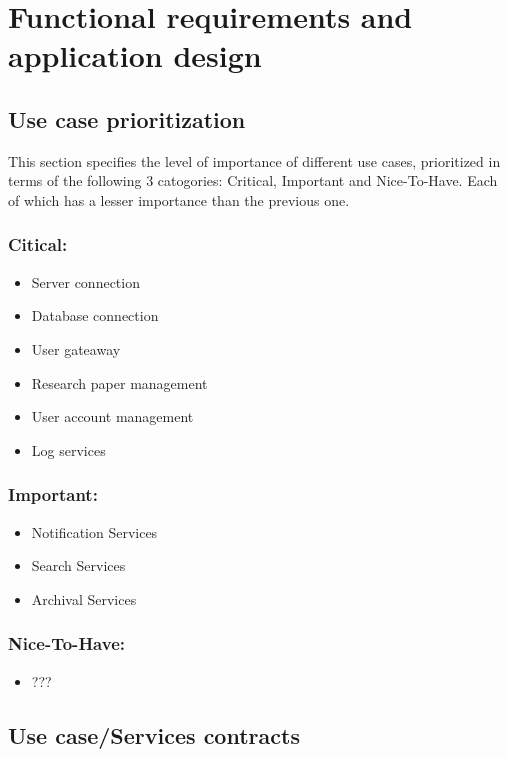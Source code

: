\documentclass[11pt]{article}
\begin{document}
\newpage

\section{Functional requirements and application design}

\subsection{Use case prioritization}
This section specifies the level of importance of different use cases, prioritized in terms of the following 3 catogories: Critical, Important and Nice-To-Have. Each of which has a lesser importance than the previous one.

\subsubsection{Citical:}
	\begin{itemize}
		\item Server connection
		\item Database connection
		\item User gateaway
		\item Research paper management
		\item User account management
		\item Log services
	\end{itemize}
	
\subsubsection{Important:}	
	\begin{itemize}
		\item Notification Services
		\item Search Services
		\item Archival Services
	\end{itemize} 
	
\subsubsection{Nice-To-Have:}
	\begin{itemize}
		\item ???
	\end{itemize}

\subsection{Use case/Services contracts}
\end{document}
